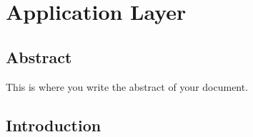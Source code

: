 \chapter[Application Layer]{Application Layer}

\section*{Abstract}         %
This is where you write the abstract of your document.

\section{Introduction}

